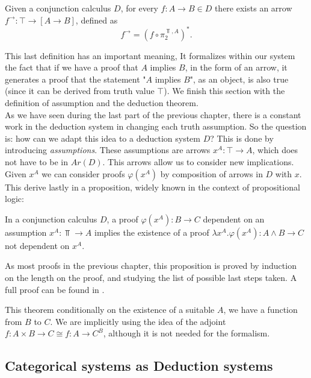 \begin{definition}
Given a conjunction calculus $D$, for every $f:A\to B \in D$ there exists an arrow $f^\to: \top \to [A\to B]$, defined as 
 $$f^\to = \left(f\circ \pi_2^{\Top,A}\right)^*.$$
\end{definition}

This last definition has an important meaning, It formalizes within our system the fact that if we have a proof that $A$ implies $B$, in the form of an arrow, it generates a proof that the statement "$A$ implies $B$", as an object, is also true (since it can be derived from truth value $\top$). We finish this section with the definition of assumption and the deduction theorem.\\

As we have seen during the last part of the previous chapter, there is a constant work in the deduction system in changing each truth assumption. So the question is: how can we adapt this idea to a deduction system $D$? This is done by introducing \emph{assumptions}. These assumptions are arrows $x^A: \top \to A$, which does not have to be in $Ar(D)$. This arrows allow us to consider new implications. Given $x^A$ we can consider proofs $\varphi(x^A)$ by composition of arrows in $D$ with $x$. This derive lastly in  a proposition, widely known in the context of propositional logic:

\begin{definition}\label{deduction-theorem}
  In a conjunction calculus $D$, a proof $\varphi(x^A): B \to C$ dependent on an assumption $x^A:\Top \to A$ implies the existence of a proof $\lambda x^A.\varphi (x^A): A\land B \to C$ not dependent on $x^A$.
\end{definition}
\begin{sproof}
  As most proofs in the previous chapter, this proposition is proved by induction on the length on the proof, and studying the list of possible last steps taken. A full proof can be found in \cite[proposition 2.1]{lambek1988introduction}.
\end{sproof}
 This theorem  conditionally on the existence of a suitable $A$, we have a function from $B$ to $C$. We are implicitly using the idea of the adjoint $f:A\times B \to C \cong f: A \to C^B$, although it is not needed for the formalism.





\subsection{Categorical systems as Deduction systems}


